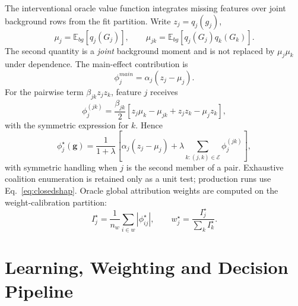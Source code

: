 \documentclass[runningheads]{llncs}
\newcommand{\E}{\mathbb{E}}
\begin{document}
The interventional oracle value function integrates missing features over joint background rows
from the fit partition. Write $z_j=q_j(g_j)$,
\begin{equation}
\mu_j=\E_{bg}[q_j(G_j)],
\qquad
\mu_{jk}=\E_{bg}[q_j(G_j)q_k(G_k)].
\label{eq:moments}
\end{equation}
The second quantity is a \emph{joint} background moment and is not replaced by
$\mu_j\mu_k$ under dependence. The main-effect contribution is
\begin{equation}
\phi_j^{main}=\alpha_j(z_j-\mu_j).
\label{eq:mainshap}
\end{equation}
For the pairwise term $\beta_{jk}z_jz_k$, feature $j$ receives
\begin{equation}
\phi_j^{(jk)}
=
\frac{\beta_{jk}}{2}
\left[z_j\mu_k-\mu_{jk}+z_jz_k-\mu_jz_k\right],
\label{eq:pairshap}
\end{equation}
with the symmetric expression for $k$. Hence
\begin{equation}
\phi_j^{\star}(\mathbf g)
=
\frac{1}{1+\lambda}
\left[
\alpha_j(z_j-\mu_j)
+
\lambda\!\sum_{k:(j,k)\in\mathcal E}\!\phi_j^{(jk)}
\right],
\label{eq:closedshap}
\end{equation}
with symmetric handling when $j$ is the second member of a pair. Exhaustive coalition
enumeration is retained only as a unit test; production runs use Eq.~\eqref{eq:closedshap}.
Oracle global attribution weights are computed on the weight-calibration partition:
\begin{equation}
I_j^\star=\frac{1}{n_w}\sum_{i\in w}|\phi_{ij}^\star|,
\qquad
w_j^\star=\frac{I_j^\star}{\sum_k I_k^\star}.
\label{eq:oracleweights}
\end{equation}

\section{Learning, Weighting and Decision Pipeline}
\label{sec:pipeline}
\end{document}
